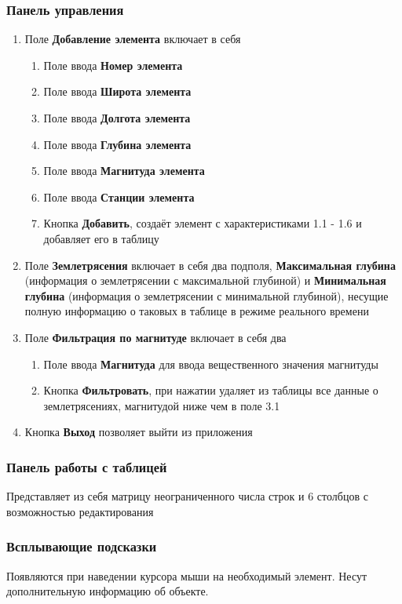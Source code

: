 \documentclass[a4paper,12pt, fleqn]{article}
\theoremstyle{plain} %
\theoremstyle{definition} %
\theoremstyle{remark} %
\numberwithin{equation}{section}
\begin{document}
\subsubsection{Панель управления}
\begin{enumerate}
	\item Поле \textbf{Добавление элемента} включает в себя
	\begin{enumerate}
		\item Поле ввода \textbf{Номер элемента}
		\item Поле ввода \textbf{Широта элемента}
		\item Поле ввода \textbf{Долгота элемента}
		\item Поле ввода \textbf{Глубина элемента}
		\item Поле ввода \textbf{Магнитуда элемента}
		\item Поле ввода \textbf{Станции элемента}
		\item Кнопка \textbf{Добавить}, создаёт элемент с характеристиками 1.1 - 1.6 и добавляет его в таблицу		
	\end{enumerate}	
	\item Поле \textbf{Землетрясения} включает в себя два подполя, \textbf{Максимальная глубина} (информация о землетрясении с максимальной глубиной) и \textbf{Минимальная глубина} (информация о землетрясении с минимальной глубиной), несущие полную информацию о таковых в таблице в режиме реального времени
	\item Поле \textbf{Фильтрация по магнитуде} включает в себя два
	\begin{enumerate}
		\item Поле ввода \textbf{Магнитуда} для ввода вещественного значения магнитуды  
		\item Кнопка \textbf{Фильтровать}, при нажатии удаляет из таблицы все данные о землетрясениях, магнитудой ниже чем в поле 3.1
	\end{enumerate}
	\item Кнопка \textbf{Выход} позволяет выйти из приложения
\end{enumerate}
\subsubsection{Панель работы с таблицей}
Представляет из себя матрицу неограниченного числа строк и 6 столбцов с возможностью редактирования  
\subsubsection{Всплывающие подсказки}
Появляются при наведении курсора мыши на необходимый элемент. Несут дополнительную информацию об объекте.
\end{document}
